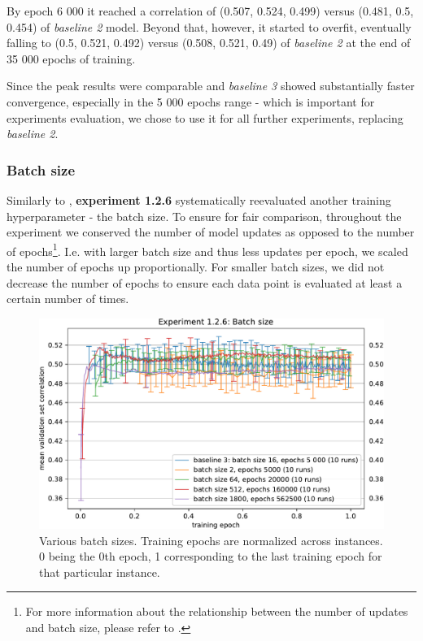 By epoch 6 000 it reached a correlation of (0.507, 0.524, 0.499) versus (0.481, 0.5, 0.454) of \emph{baseline 2} model. Beyond that, however, it started to overfit, eventually falling to (0.5, 0.521, 0.492) versus (0.508, 0.521, 0.49) of \emph{baseline 2} at the end of 35 000 epochs of training. 

Since the peak results were comparable and \emph{baseline 3} showed substantially faster convergence, especially in the 5 000 epochs range - which is important for experiments evaluation, we chose to use it for all further experiments, replacing \emph{baseline 2}.

\subsubsection{Batch size}

Similarly to , \textbf{experiment 1.2.6} systematically reevaluated another training hyperparameter - the batch size. To ensure for fair comparison, throughout the experiment we conserved the number of model updates as opposed to the number of epochs\footnote{For more information about the relationship between the number of updates and batch size, please refer to .}. I.e. with larger batch size and thus less updates per epoch, we scaled the number of epochs up proportionally. For smaller batch sizes, we did not decrease the number of epochs to ensure each data point is evaluated at least a certain number of times.

\begin{figure}[H]
    \centering
    \includegraphics[width=1\textwidth]{../figures/05_1_2_6}
    \caption[Experiment 1.2.6]{Various batch sizes. Training epochs are normalized across instances. 0 being the 0th epoch, 1 corresponding to the last training epoch for that particular instance.}
    \label{fig:5.1.2.6}
\end{figure}


